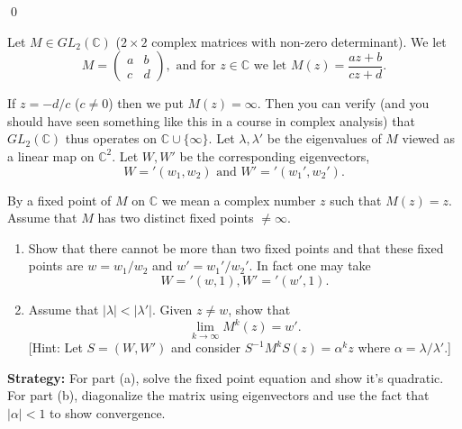 \qed
\begin{problembox}
Let $M \in GL_2(\mathbb{C})$ ($2 \times 2$ complex matrices with non-zero determinant). We let
\[M = \begin{pmatrix}
a & b \\
c & d 
\end{pmatrix}, \text{ and for } z \in \mathbb{C} \text{ we let } M(z) = \frac{az + b}{cz + d}.\]

If $z = -d/c$ ($c \neq 0$) then we put $M(z) = \infty$. Then you can verify (and you should have seen something like this in a course in complex analysis) that $GL_2(\mathbb{C})$ thus operates on $\mathbb{C} \cup \{\infty\}$. Let $\lambda, \lambda'$ be the eigenvalues of $M$ viewed as a linear map on $\mathbb{C}^2$. Let $W, W'$ be the corresponding eigenvectors,
\[W = '(w_1, w_2) \text{ and } W' = '(w_1', w_2').\]

By a fixed point of $M$ on $\mathbb{C}$ we mean a complex number $z$ such that $M(z) = z$. Assume that $M$ has two distinct fixed points $\neq \infty$.
\begin{enumerate}[label=(\alph*)]
\item Show that there cannot be more than two fixed points and that these fixed points are $w = w_1 / w_2$ and $w' = w_1' / w_2'$. In fact one may take
\[ W = '(w, 1), W' = '(w', 1). \]
\item Assume that $|\lambda| < |\lambda'|$. Given $z \neq w$, show that
\[ \lim_{k \to \infty} M^k(z) = w'. \]
[Hint: Let $S = (W, W')$ and consider $S^{-1}M^kS(z) = \alpha^kz$ where $\alpha = \lambda / \lambda'$.]
\end{enumerate}
\end{problembox}

\noindent\textbf{Strategy:} For part (a), solve the fixed point equation and show it's quadratic. For part (b), diagonalize the matrix using eigenvectors and use the fact that $|\alpha| < 1$ to show convergence.

